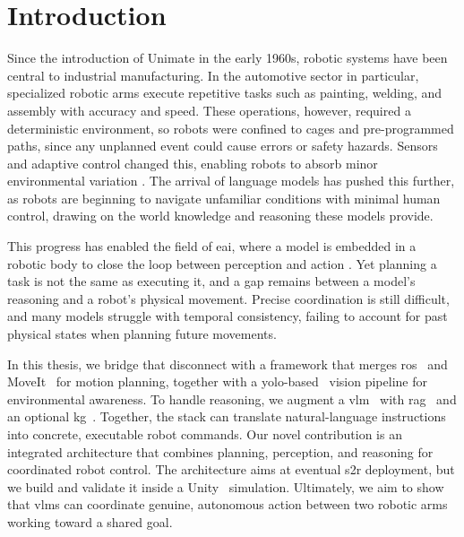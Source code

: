 \chapter{Introduction}\label{intro}
Since the introduction of Unimate in the early 1960s, robotic systems have been central to industrial manufacturing. In the automotive sector in particular, specialized robotic arms execute repetitive tasks such as painting, welding, and assembly with accuracy and speed. These operations, however, required a deterministic environment, so robots were confined to cages and pre-programmed paths, since any unplanned event could cause errors or safety hazards. Sensors and adaptive control changed this, enabling robots to absorb minor environmental variation \cite{Li2020}. The arrival of language models has pushed this further, as robots are beginning to navigate unfamiliar conditions with minimal human control, drawing on the world knowledge and reasoning these models provide.

This progress has enabled the field of \gls{eai}, where a model is embedded in a robotic body to close the loop between perception and action \cite{liu2025aligningcyberspacephysical}. Yet planning a task is not the same as executing it, and a gap remains between a model’s reasoning and a robot’s physical movement. Precise coordination is still difficult, and many models struggle with temporal consistency, failing to account for past physical states when planning future movements.

In this thesis, we bridge that disconnect with a framework that merges \gls{ros}~\cite{Macenski_2022} and MoveIt~\cite{coleman2014reducingbarrierentrycomplex} for motion planning, together with a \gls{yolo}-based~\cite{yolov8_ultralytics} vision pipeline for environmental awareness. To handle reasoning, we augment a \gls{vlm}~\cite{mistral_magistral_small_2025} with \gls{rag}~\cite{lewis2021retrievalaugmentedgenerationknowledgeintensivenlp} and an optional \gls{kg}~\cite{Hogan_2021}. Together, the stack can translate natural-language instructions into concrete, executable robot commands. Our novel contribution is an integrated architecture that combines planning, perception, and reasoning for coordinated robot control. The architecture aims at eventual \gls{s2r} deployment, but we build and validate it inside a Unity~\cite{unity} simulation. Ultimately, we aim to show that \glspl{vlm} can coordinate genuine, autonomous action between two robotic arms working toward a shared goal.

